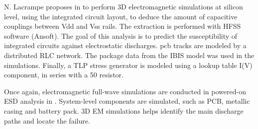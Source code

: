N. Lacrampe proposes in \cite{LacrampeTransientImmunity} to perform 3D electromagnetic simulations at silicon level, using the integrated circuit layout, to deduce the amount of capacitive couplings between Vdd and Vss rails.
The extraction is performed with HFSS software (Ansoft).
The goal of this analysis is to predict the susceptibility of integrated circuits against electrostatic discharges.
\gls{pcb} tracks are modeled by a distributed RLC network.
The package data from the IBIS model \cite{ibis-spec} was used in the simulations.
Finally, a TLP stress generator is modeled using a lookup table I(V) component, in series with a 50\textOmega{} resistor.

Once again, electromagnetic full-wave simulations are conducted in powered-on ESD analysis in \cite{softFailMobile}.
System-level components are simulated, such as PCB, metallic casing and battery pack.
3D EM simulations helps identify the main discharge paths and locate the failure.
